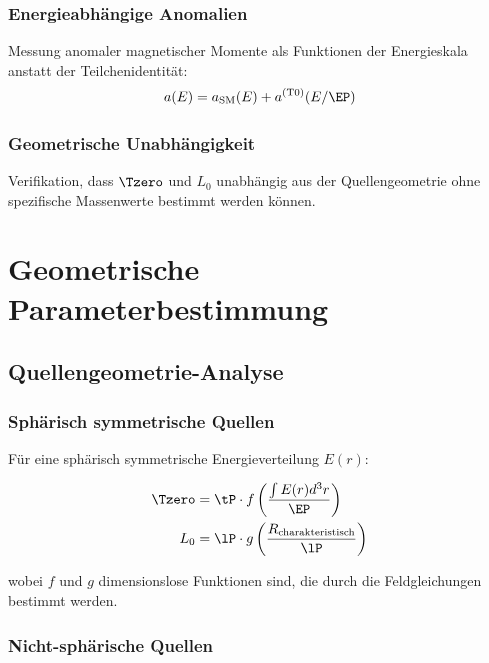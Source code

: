 	\subsubsection{Energieabhängige Anomalien}
	
	Messung anomaler magnetischer Momente als Funktionen der Energieskala anstatt der Teilchenidentität:
	\begin{equation}
		a(E) = a_{\text{SM}}(E) + a^{(\text{T0})}(E/\EP)
		\label{eq:energy_dependent_anomaly}
	\end{equation}
	
	\subsubsection{Geometrische Unabhängigkeit}
	
	Verifikation, dass $\Tzero$ und $L_0$ unabhängig aus der Quellengeometrie ohne spezifische Massenwerte bestimmt werden können.
	
	\section{Geometrische Parameterbestimmung}
	\label{sec:geometric_parameters}
	
	\subsection{Quellengeometrie-Analyse}
	\label{subsec:source_geometry}
	
	\subsubsection{Sphärisch symmetrische Quellen}
	
	Für eine sphärisch symmetrische Energieverteilung $E(r)$:
	
	\begin{align}
		\Tzero &= \tP \cdot f\left(\frac{\int E(r) d^3r}{\EP}\right) \\
		L_0 &= \lP \cdot g\left(\frac{R_{\text{charakteristisch}}}{\lP}\right)
	\end{align}
	
	wobei $f$ und $g$ dimensionslose Funktionen sind, die durch die Feldgleichungen bestimmt werden.
	
	\subsubsection{Nicht-sphärische Quellen}
	
